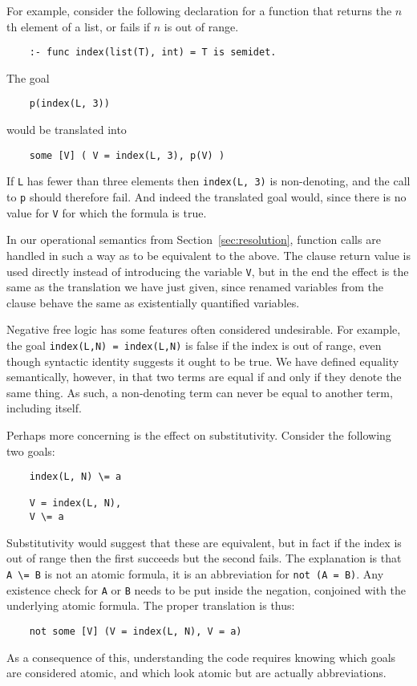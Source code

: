 For example, consider the following declaration
for a function that returns the $n$th element of a list,
or fails if $n$ is out of range.
\begin{verbatim}
    :- func index(list(T), int) = T is semidet.
\end{verbatim}
The goal
\begin{verbatim}
    p(index(L, 3))
\end{verbatim}
would be translated into
\begin{verbatim}
    some [V] ( V = index(L, 3), p(V) )
\end{verbatim}
If \texttt{L} has fewer than three elements
then \texttt{index(L, 3)} is non-denoting,
and the call to \texttt{p} should therefore fail.
And indeed the translated goal would,
since there is no value for \texttt{V}
for which the formula is true.

In our operational semantics
from Section~\ref{sec:resolution},
function calls are handled
in such a way as to be equivalent to the above.
The clause return value is used directly
instead of introducing the variable \texttt{V},
but in the end the effect is the same as
the translation we have just given,
since renamed variables from the clause
behave the same as existentially quantified variables.

Negative free logic has some features often considered undesirable.
For example, the goal \texttt{index(L,N) = index(L,N)}
is false if the index is out of range,
even though syntactic identity suggests it ought to be true.
We have defined equality semantically, however,
in that two terms are equal if and only if they denote the same thing.
As such,
a non-denoting term can never be equal to another term,
including itself.

Perhaps more concerning is the effect on substitutivity.
Consider the following two goals:
\begin{verbatim}
    index(L, N) \= a

    V = index(L, N),
    V \= a
\end{verbatim}
Substitutivity would suggest that these are equivalent,
but in fact if the index is out of range
then the first succeeds but the second fails.
The explanation is that \verb#A \= B# is not an atomic formula,
it is an abbreviation for \texttt{not (A = B)}.
Any existence check for \texttt{A} or \texttt{B}
needs to be put inside the negation,
conjoined with the underlying atomic formula.
The proper translation is thus:
\begin{verbatim}
    not some [V] (V = index(L, N), V = a)
\end{verbatim}
As a consequence of this,
understanding the code requires knowing which goals are considered atomic,
and which look atomic but are actually abbreviations.

